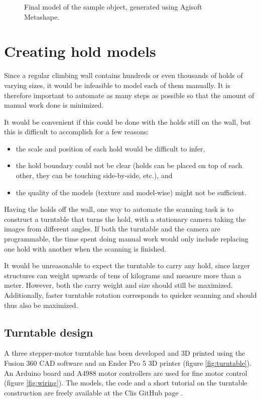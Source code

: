 \begin{figure}
	\centering
	\hfill
	\caption{Final model of the sample object, generated using Agisoft Metashape.}%
\end{figure}

\section{Creating hold models}
Since a regular climbing wall contains hundreds or even thousands of holds of varying sizes, it would be infeasible to model each of them manually.
It is therefore important to automate as many steps as possible so that the amount of manual work done is minimized.

It would be convenient if this could be done with the holds still on the wall, but this is difficult to accomplish for a few reasons:
\begin{itemize}
	\item the scale and position of each hold would be difficult to infer,
	\item the hold boundary could not be clear (holds can be placed on top of each other, they can be touching side-by-side, etc.), and
	\item the quality of the models (texture and model-wise) might not be sufficient.
\end{itemize}

Having the holds off the wall, one way to automate the scanning task is to construct a turntable that turns the hold, with a stationary camera taking the images from different angles.
If both the turntable and the camera are programmable, the time spent doing manual work would only include replacing one hold with another when the scanning is finished.

It would be unreasonable to expect the turntable to carry any hold, since larger structures can weight upwards of tens of kilograms and measure more than a meter.
However, both the carry weight and size should still be maximized.
Additionally, faster turntable rotation corresponds to quicker scanning and should thus also be maximized.

\subsection{Turntable design}
A three stepper-motor turntable has been developed and 3D printed using the Fusion 360 CAD software and an Ender Pro 5 3D printer (figure \ref{fig:turntable}).
An Arduino board and A4988 motor controllers are used for fine motor control (figure \ref{fig:wiring}).
The models, the code and a short tutorial on the turntable construction are freely available at the Clis GitHub page \cite{clis}.

